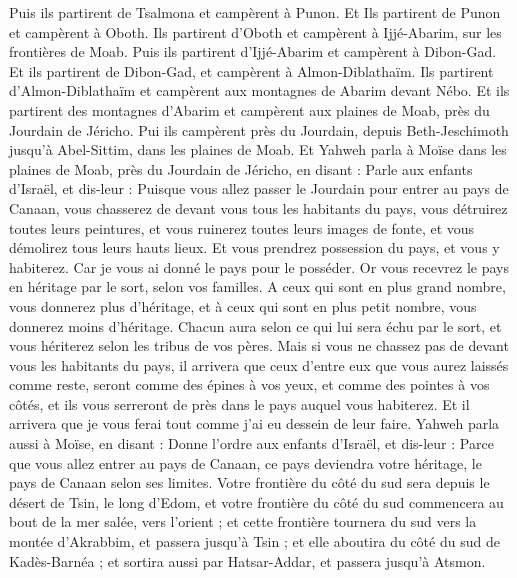 \begin{multicols}{2}
Puis ils partirent de Tsalmona et campèrent à Punon.
Et Ils partirent de Punon et campèrent à Oboth.
Ils partirent d'Oboth et campèrent à Ijjé-Abarim, sur les frontières de Moab.
Puis ils partirent d'Ijjé-Abarim et campèrent à Dibon-Gad.
Et ils partirent de Dibon-Gad, et campèrent à Almon-Diblathaïm.
Ils partirent d'Almon-Diblathaïm et campèrent aux montagnes de Abarim devant Nébo.
Et ils partirent des montagnes d'Abarim et campèrent aux plaines de Moab, près du Jourdain de Jéricho.
Pui ils campèrent près du Jourdain, depuis Beth-Jeschimoth jusqu'à Abel-Sittim, dans les plaines de Moab.
Et Yahweh parla à Moïse dans les plaines de Moab, près du Jourdain de Jéricho, en disant :
Parle aux enfants d'Israël, et dis-leur : Puisque vous allez passer le Jourdain pour entrer au pays de Canaan,
vous chasserez de devant vous tous les habitants du pays, vous détruirez toutes leurs peintures, et vous ruinerez toutes leurs images de fonte, et vous démolirez tous leurs hauts lieux.
Et vous prendrez possession du pays, et vous y habiterez. Car je vous ai donné le pays pour le posséder.
Or vous recevrez le pays en héritage par le sort, selon vos familles. A ceux qui sont en plus grand nombre, vous donnerez plus d’héritage, et à ceux qui sont en plus petit nombre, vous donnerez moins d’héritage. Chacun aura selon ce qui lui sera échu par le sort, et vous hériterez selon les tribus de vos pères.
Mais si vous ne chassez pas de devant vous les habitants du pays, il arrivera que ceux d'entre eux que vous aurez laissés comme reste, seront comme des épines à vos yeux, et comme des pointes à vos côtés, et ils vous serreront de près dans le pays auquel vous habiterez.
Et il arrivera que je vous ferai tout comme j’ai eu dessein de leur faire.
\VerseOne{}Yahweh parla aussi à Moïse, en disant :
Donne l'ordre aux enfants d'Israël, et dis-leur :  Parce que vous allez entrer au pays de Canaan, ce pays deviendra votre héritage, le pays de Canaan selon ses limites.
Votre frontière du côté du sud sera depuis le désert de Tsin, le long d'Edom, et votre frontière du côté du sud commencera au bout de la mer salée, vers l'orient ;
et cette frontière tournera du sud vers la montée d'Akrabbim, et passera jusqu'à Tsin ; et elle aboutira du côté du sud de Kadès-Barnéa ; et sortira aussi par Hatsar-Addar, et passera jusqu'à Atsmon.

\end{multicols}
